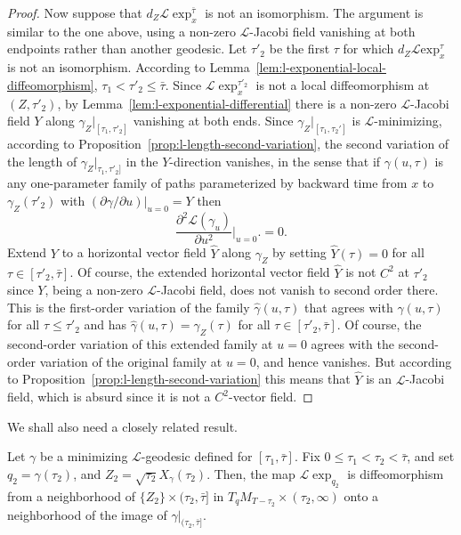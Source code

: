 \begin{proof}
 Now suppose  that $d_Z{\mathcal L}\exp_x^{\bar\tau}$ is not an isomorphism.
The argument is similar to the one above, using a non-zero
${\mathcal L}$-Jacobi field vanishing at both endpoints rather than
another geodesic. Let $\tau'_2$ be the first $\tau$ for which
$d_Z{\mathcal L}\mathrm{exp}_x^\tau$ is not an isomorphism.
According to Lemma~\ref{lem:l-exponential-local-diffeomorphism}, $\tau_1<\tau'_2\le \bar\tau$. Since
${\mathcal L}\exp_x^{\tau'_2}$ is not a local diffeomorphism at
$(Z,\tau'_2)$, by Lemma~\ref{lem:l-exponential-differential}  there is a non-zero
${\mathcal L}$-Jacobi field $Y$ along $\gamma_Z|_{[\tau_1,\tau'_2]}$
vanishing at both ends. Since $\gamma_Z|_{[\tau_1,\tau_2']}$ is
${\mathcal L}$-minimizing, according to Proposition~\ref{prop:l-length-second-variation},
the second variation of the length of $\gamma_Z|_{\tau_1,\tau'_2]}$
in the $Y$-direction vanishes, in the sense that if $\gamma(u,\tau)$
is any one-parameter family of paths parameterized by backward time
from $x$ to $\gamma_Z(\tau'_2)$ with $(\partial \gamma/\partial
u)|_{u=0}=Y$ then
$$\frac{\partial^2{\mathcal L}(\gamma_u)}{\partial
u^2}\bigl|_{u=0}\bigr.=0.$$ Extend $Y$ to a horizontal vector field
$\widehat Y$ along $\gamma_Z$ by setting $\widehat Y(\tau)=0$ for
all $\tau\in [\tau'_2,\bar\tau]$. Of course, the extended horizontal
vector field $\widehat Y$ is not $C^2$ at $\tau'_2$ since $Y$, being
a non-zero ${\mathcal L}$-Jacobi field, does not vanish to second
order there. This is the first-order variation of the family
$\hat\gamma(u,\tau)$ that agrees with $\gamma(u,\tau)$ for all
$\tau\le \tau'_2$ and has $\hat\gamma(u,\tau)=\gamma_Z(\tau)$ for
all $\tau\in [\tau'_2,\bar\tau]$. Of course, the second-order
variation of this extended family at $u=0$ agrees with the
second-order variation of the original family at $u=0$, and hence
vanishes. But according to Proposition~\ref{prop:l-length-second-variation} this means that
$\widehat Y$ is an ${\mathcal L}$-Jacobi field, which is absurd
since it is not a $C^2$-vector field.
\end{proof}



We shall also need a closely related result.

\begin{proposition}\label{prop:l-exponential-diffeomorphism-along-geodesic}
\label{tausmooth}
Let $\gamma$ be a minimizing ${\mathcal L}$-geodesic defined for
$[\tau_1,\bar\tau]$. Fix $0\le\tau_1<\tau_2<\bar\tau$, and set
$q_2=\gamma(\tau_2)$, and $Z_2=\sqrt{\tau_2}X_{\gamma}(\tau_2)$.
Then, the map ${\mathcal L}\exp_{q_2}$ is  diffeomorphism from
a neighborhood of $\{Z_2\}\times (\tau_2,\bar\tau]$ in
$T_{q}M_{T-\tau_2}\times (\tau_2,\infty)$ onto a neighborhood of the
image of  $\gamma|_{(\tau_2,\bar\tau]}$.
\end{proposition}

